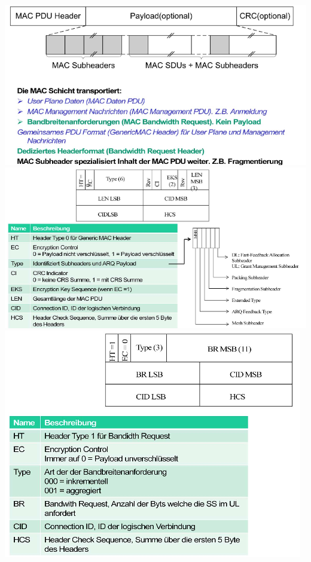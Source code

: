 \includegraphics[width = 0.75 \linewidth]{./pics/wimaxmac.png} \\

\includegraphics[width = 0.75 \linewidth]{./pics/wimaxmac2.png} \\

\includegraphics[width = 0.65 \linewidth]{./pics/wimaxmac3.png} \\

